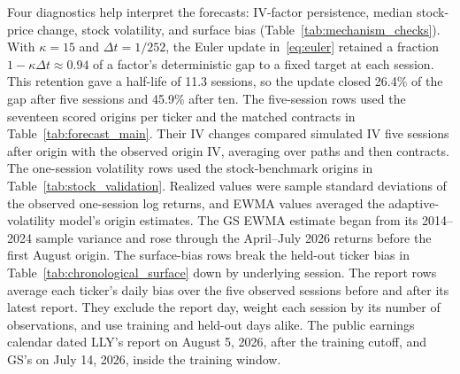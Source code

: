 Four diagnostics help interpret the forecasts: IV-factor persistence, median stock-price change, stock volatility, and surface bias (Table~\ref{tab:mechanism_checks}). With $\kappa=15$ and $\Delta t=1/252$, the Euler update in~\eqref{eq:euler} retained a fraction $1-\kappa\Delta t\approx0.94$ of a factor's deterministic gap to a fixed target at each session. This retention gave a half-life of 11.3 sessions, so the update closed 26.4\% of the gap after five sessions and 45.9\% after ten. The five-session rows used the seventeen scored origins per ticker and the matched contracts in Table~\ref{tab:forecast_main}. Their IV changes compared simulated IV five sessions after origin with the observed origin IV, averaging over paths and then contracts. The one-session volatility rows used the stock-benchmark origins in Table~\ref{tab:stock_validation}. Realized values were sample standard deviations of the observed one-session log returns, and EWMA values averaged the adaptive-volatility model's origin estimates. The GS EWMA estimate began from its 2014--2024 sample variance and rose through the April--July 2026 returns before the first August origin. The surface-bias rows break the held-out ticker bias in Table~\ref{tab:chronological_surface} down by underlying session. The report rows average each ticker's daily bias over the five observed sessions before and after its latest report. They exclude the report day, weight each session by its number of observations, and use training and held-out days alike. The public earnings calendar dated LLY's report on August 5, 2026, after the training cutoff, and GS's on July 14, 2026, inside the training window.

\begin{table}[H]
\centering
\caption{Diagnostics of IV-factor persistence, median stock-price change, stock volatility, and surface bias. Five-session rows average the scored shorter-maturity origins and matched options. Changes in IV are in volatility percentage points relative to the observed origin IV. One-session stock rows use the 2025 and August--September 2026 stock-benchmark origins. Surface bias is predicted minus observed IV for the July-cutoff sector surface, in volatility percentage points. Earnings reports fell on August 5, 2026, for LLY and July 14, 2026, for GS. Report rows exclude the report day.}\label{tab:mechanism_checks}

\end{table}

